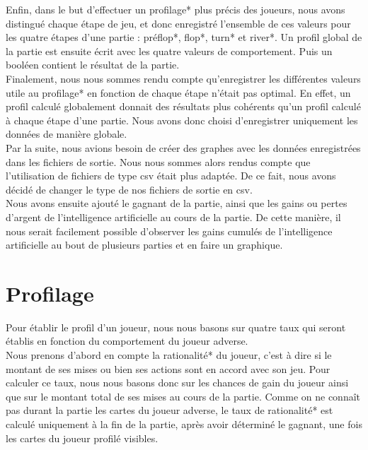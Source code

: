\documentclass{report}
\begin{document}
Enfin, dans le but d'effectuer un profilage* plus précis des joueurs, nous avons distingué chaque étape de jeu, et donc enregistré l'ensemble de ces valeurs pour les quatre étapes d'une partie : préflop*, flop*, turn* et river*. Un profil global de la partie est ensuite écrit avec les quatre valeurs de comportement. Puis un booléen contient le résultat de la partie.\\

Finalement, nous nous sommes rendu compte qu'enregistrer les différentes valeurs utile au profilage* en fonction de chaque étape n'était pas optimal. En effet, un profil calculé globalement donnait des résultats plus cohérents qu'un profil calculé à chaque étape d'une partie. Nous avons donc choisi d'enregistrer uniquement les données de manière globale.\\


Par la suite, nous avions besoin de créer des graphes avec les données enregistrées dans les fichiers de sortie. Nous nous sommes alors rendus compte que l'utilisation de fichiers de type csv était plus adaptée. De ce fait, nous avons décidé de changer le type de nos fichiers de sortie en csv.\\

Nous avons ensuite ajouté le gagnant de la partie, ainsi que les gains ou pertes d'argent de l'intelligence artificielle au cours de la partie. De cette manière, il nous serait facilement possible d'observer les gains cumulés de l'intelligence artificielle au bout de plusieurs parties et en faire un graphique.\par


\section{Profilage}
\hspace{0.5cm}Pour établir le profil d'un joueur, nous nous basons sur quatre taux qui seront établis en fonction du comportement du joueur adverse.\\

Nous prenons d'abord en compte la rationalité* du joueur, c'est à dire si le montant de ses mises ou bien ses actions sont en accord avec son jeu. Pour calculer ce taux, nous nous basons donc sur les chances de gain du joueur ainsi que sur le montant total de ses mises au cours de la partie. Comme on ne connaît pas durant la partie les cartes du joueur adverse, le taux de rationalité* est calculé uniquement à la fin de la partie, après avoir déterminé le gagnant, une fois les cartes du joueur profilé visibles.\\
\end{document}
